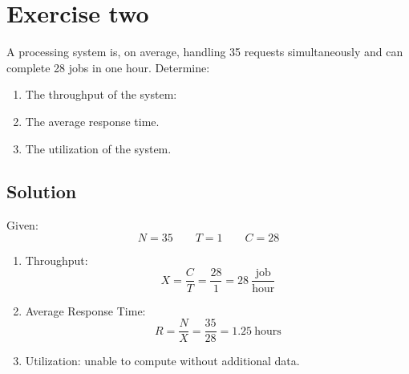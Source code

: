 \section{Exercise two}

A processing system is, on average, handling 35 requests simultaneously and can complete 28 jobs in one hour. 
Determine:
\begin{enumerate}
    \item The throughput of the system: 
    \item The average response time.
    \item The utilization of the system.
\end{enumerate}

\subsection*{Solution}
Given:
\[N = 35 \qquad T=1\qquad C=28\]
\begin{enumerate}
    \item Throughput:
        \[X=\dfrac{C}{T}=\dfrac{28}{1}=28\:\dfrac{\text{job}}{\text{hour}}\]
    \item Average Response Time:
        \[R=\dfrac{N}{X}=\dfrac{35}{28}=1.25\:\text{hours}\]
    \item Utilization: unable to compute without additional data.
\end{enumerate}